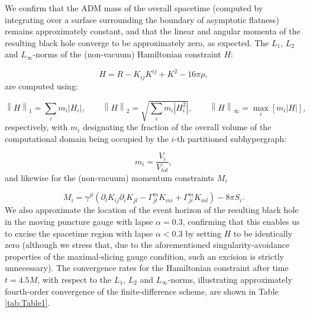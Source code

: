 \documentclass{article}
\begin{document}
We confirm that the ADM mass of the overall spacetime (computed by integrating over a surface surrounding the boundary of asymptotic flatness) remains approximately constant, and that the linear and angular momenta of the resulting black hole converge to be approximately zero, as expected. The ${L_1}$, ${L_2}$ and ${L_{\infty}}$-norms of the (non-vacuum) Hamiltonian constraint $H$:

\begin{equation}
H = R - K_{i j} K^{i j} + K^2 - 16 \pi \rho,
\end{equation}
are computed using:

\begin{equation}
\left\lVert H \right\rVert_1 = \sum_{i} m_i \left\lvert H_i \right\rvert, \qquad \left\lVert H \right\rVert_2 = \sqrt{\sum_{i} m_i \left\lvert H_{i}^{2} \right\rvert}, \qquad \left\lVert H \right\rVert_{\infty} = \max_{i} \left[ m_i \left\lvert H \right\rvert \right],
\end{equation}
respectively, with ${m_i}$ designating the fraction of the overall volume of the computational domain being occupied by the $i$-th partitioned subhypergraph:

\begin{equation}
m_i = \frac{V_i}{V_{tot}},
\end{equation}
and likewise for the (non-vacuum) momentum constraints ${M_i}$

\begin{equation}
M_i = \gamma^{j l} \left( \partial_l K_{i j} \partial_i K_{j l} - \Gamma_{j l}^{m} K_{m i} + \Gamma_{j i}^{m} K_{m l} \right) - 8 \pi S_i.
\end{equation}
We also approximate the location of the event horizon of the resulting black hole in the moving puncture gauge with lapse ${\alpha = 0.3}$, confirming that this enables us to excise the spacetime region with lapse ${\alpha < 0.3}$ by setting $H$ to be identically zero (although we stress that, due to the aforementioned singularity-avoidance properties of the maximal-slicing gauge condition\cite{alcubierre}\cite{alcubierre2}, such an excision is strictly unnecessary). The convergence rates for the Hamiltonian constraint after time ${t = 4.5 M}$, with respect to the ${L_1}$, ${L_2}$ and ${L_{\infty}}$-norms, illustrating approximately fourth-order convergence of the finite-difference scheme, are shown in Table \ref{tab:Table1}.
\end{document}
